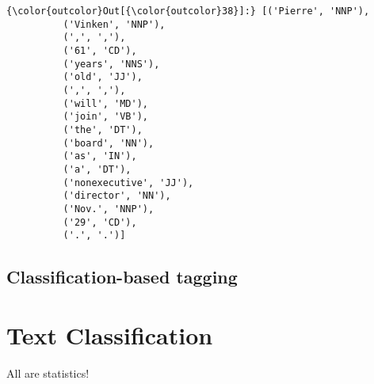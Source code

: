 \documentclass{article}
\begin{document}
            \begin{Verbatim}[commandchars=\\\{\}]
{\color{outcolor}Out[{\color{outcolor}38}]:} [('Pierre', 'NNP'),
          ('Vinken', 'NNP'),
          (',', ','),
          ('61', 'CD'),
          ('years', 'NNS'),
          ('old', 'JJ'),
          (',', ','),
          ('will', 'MD'),
          ('join', 'VB'),
          ('the', 'DT'),
          ('board', 'NN'),
          ('as', 'IN'),
          ('a', 'DT'),
          ('nonexecutive', 'JJ'),
          ('director', 'NN'),
          ('Nov.', 'NNP'),
          ('29', 'CD'),
          ('.', '.')]
\end{Verbatim}

    \subsection{Classification-based
tagging}\label{classification-based-tagging}

    \section{Text Classification}\label{text-classification}

All are statistics!





    
\end{document}
